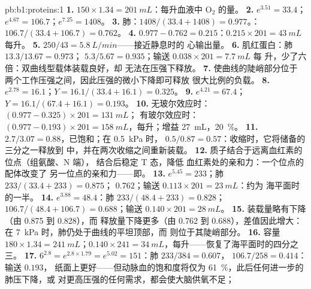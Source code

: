 \begin{solution}{pb:b1:proteins:1}
\textbf{1.} $150\times 1.34 = \qty{201}{mL}$：每升血液中 $\mathrm{O_2}$ 的量。
\textbf{2.} $e^{3.51} = 33.4$；$e^{4.67} = 106.7$；$e^{7.25} = 1408$。
\textbf{3.} 肺：$1408/(33.4 + 1408) = 0.977$。：
$106.7/(33.4 + 106.7) = 0.762$。
\textbf{4.} $0.977 - 0.762 = 0.215$：$0.215\times 201 = \qty{43}{mL}$
每升。
\textbf{5.} $250/43 = \qty{5.8}{L/min}$——接近静息时的
心输出量。
\textbf{6.} 肌红蛋白：肺 $13.3/13.67 = 0.973$；
$5.3/5.67 = 0.935$；输送 $0.038\times 201 = \qty{7.7}{mL}$ 每
升，少了六倍：双曲线型载体装载良好，却
无法在压强下释放。
\textbf{7.} 使曲线的陡峭部分位于
两个工作压强之间，因此压强的微小下降即可释放
很大比例的负载。
\textbf{8.} $e^{2.78} = 16.1$；$Y = 16.1/(33.4 + 16.1) = 0.325$。
\textbf{9.} $e^{4.21} = 67.4$；$Y = 16.1/(67.4 + 16.1) = 0.193$。
\textbf{10.} 无玻尔效应时：$(0.977 - 0.325)\times 201 = \qty{131}{mL}$；
有玻尔效应时：$(0.977 - 0.193)\times 201 = \qty{158}{mL}$，每升；增益
\qty{27}{mL}，\qty{20}{\%}。
\textbf{11.} $2.7/3.07 = 0.88$，已饱和；在 \qty{0.5}{kPa} 时，
$0.5/0.87 = 0.57$：收缩时，它将储备的三分之一释放到
中，并在两次收缩之间重新装载。
\textbf{12.} 质子结合于远离血红素的位点（组氨酸、N 端），
结合后稳定 T 态，降低
血红素处的亲和力：一个位点的配体改变了
另一位点的亲和力——即。
\textbf{13.} $e^{5.45} = 233$；肺 $233/(33.4 + 233) = 0.875$；
 $0.762$；输送 $0.113\times 201 = \qty{23}{mL}$：约为
海平面时的一半。
\textbf{14.} $e^{3.88} = 48.4$：肺 $233/(48.4 + 233) = 0.828$；
 $106.7/(48.4 + 106.7) = 0.688$；输送 $0.140\times 201 =
\qty{28}{mL}$。
\textbf{15.} 装载量略有下降（由 0.875 到 0.828），而
释放量下降更多（由 0.762 到 0.688），差值因此增大：在
\qty{7}{kPa} 时，肺仍处于曲线的平坦顶部，而
则位于其陡峭部分。
\textbf{16.} 容量 $180\times 1.34 = \qty{241}{mL}$；$0.140\times
241 = \qty{34}{mL}$，每升——恢复了海平面时的四分之三。
\textbf{17.} $6^{2.8} = e^{2.8\times 1.79} = e^{5.02} = 151$：肺
$233/384 = 0.607$， $106.7/258 = 0.414$：输送 $0.193$，
纸面上更好——但动脉血的饱和度将仅为
\qty{61}{\%}，此后任何进一步的肺压下降，或
对更高压强的任何需求，都会使大脑供氧不足；

\end{solution}
